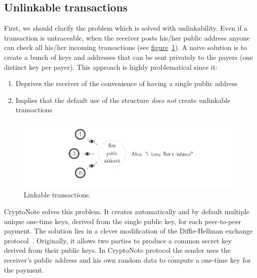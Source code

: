 \subsection{Unlinkable transactions}
First, we should clarify the problem which is solved with unlinkability. Even if a transaction is untraceable, when the receiver posts his/her public address anyone can check all his/her incoming transactions (see \hyperref[fig:linkable]{figure}~\ref{fig:linkable}). A naive solution is to create a bunch of keys and addresses that can be sent privately to the payers (one distinct key per payer). This approach is highly problematical since it:
\begin{enumerate}[label=\alph*)]
  \item Deprives the receiver of the convenience of having a single public address
  \item Implies that the default use of the structure \emph{does not} create unlinkable transactions
\end{enumerate}
\begin{figure}[H]
  \centering
  \includegraphics[width=0.9 \columnwidth,keepaspectratio]{Images/CryptoNote/linkable.png}
  \caption{Linkable transactions.~\cite{cryptonote}}
  \label{fig:linkable}
\end{figure}
\vspace{0.15cm}

CryptoNote solves this problem. It creates automatically and by default multiple unique one-time keys, derived from the single public key, for each peer-to-peer payment. The solution lies in a clever modification of the Diffie-Hellman exchange protocol~\cite{Diffie:2006:NDC:2263321.2269104}. Originally, it allows two parties to produce a common secret key derived from their public keys. In CryptoNote protocol the sender uses the receiver's public address and his own random data to compute a one-time key for the payment.

